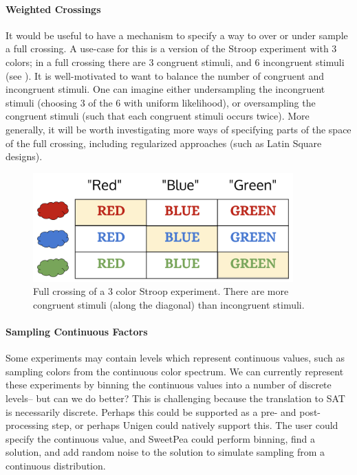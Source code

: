 \paragraph*{Weighted Crossings}
It would be useful to have a mechanism to specify a way to over or under sample a full crossing. A use-case for this is a version of the Stroop experiment with 3 colors; in a full crossing there are 3 congruent stimuli, and 6 incongruent stimuli (see ). It is well-motivated to want to balance the number of congruent and incongruent stimuli. One can imagine either undersampling the incongruent stimuli (choosing 3 of the 6 with uniform likelihood), or oversampling the congruent stimuli (such that each congruent stimuli occurs twice). More generally, it will be worth investigating more ways of specifying parts of the space of the full crossing, including regularized approaches (such as Latin Square designs).

\begin{figure}[t]
    \centerline{\includegraphics[origin=c,width=10cm]{fig_weighted_crossing}}
    \caption{Full crossing of a 3 color Stroop experiment. There are more congruent stimuli (along the diagonal) than incongruent stimuli.}%
    \label{fig:weighted_crossing}%
\end{figure}

\paragraph*{Sampling Continuous Factors}
Some experiments may contain levels which represent continuous values, such as sampling colors from the continuous color spectrum. We can currently represent these experiments by binning the continuous values into a number of discrete levels-- but can we do better? This is challenging because the translation to SAT is necessarily discrete. Perhaps this could be supported as a pre- and post- processing step, or perhaps Unigen could natively support this. The user could specify the continuous value, and SweetPea could perform binning, find a solution, and add random noise to the solution to simulate sampling from a continuous distribution.

